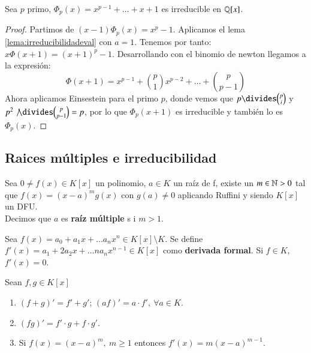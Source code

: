\begin{thm}
    Sea $p$ primo, $\Phi_p(x) = x^{p-1} + \ldots + x + 1$ es irreducible en $\mathbb{Q}[x]$.
\end{thm}
\begin{proof}
    Partimos de $(x-1)\Phi_p(x) = x^p - 1$. Aplicamos el lema \ref{lema:irreducibilidadeval} con $a = 1$. Tenemos por tanto:
    $x \Phi(x+1) = (x+1)^p - 1$. Desarrollando con el binomio de newton llegamos a la expresión:
    $$
        \Phi(x+1) = x^{p-1} + \binom{p}{1} x^{p-2} + \ldots + \binom{p}{p-1}
    $$
    Ahora aplicamos Einsestein para el primo $p$, donde vemos que $p \divides \binom{p}{i}$ y $p^2 \not \divides \binom{p}{p-1} = p$, por lo que $\Phi_p(x+1)$ es irreducible y también lo es $\Phi_p(x)$.
\end{proof}

\subsection{Raices múltiples e irreducibilidad}

\begin{dfn}
    Sea $0 \neq f(x) \in K[x]$ un polinomio, $a \in K$ un raíz de f, existe un $m \in \mathbb{N} > 0$ tal que $f(x) = (x - a)^m g(x)$ con $g(a) \neq 0$ aplicando Ruffini y siendo $K[x]$ un DFU.\\
    Decimos que $a$ es \textbf{raíz múltiple} s i $m > 1$.
\end{dfn}

\begin{dfn}
    Sea $f(x) = a_0 + a_1 x + \ldots a_n x^n \in K[x]\setminus K$. Se define $f'(x) = a_1 + 2a_2 x + \ldots n a_n x^{n-1} \in K[x]$ como \textbf{derivada formal}. Si $f \in K$, $f'(x) = 0$.
\end{dfn}

\begin{pro}
    Sean $f, g \in K[x]$
    \begin{enumerate}
        \item $(f + g)' = f' + g'$; $(af)' = a\cdot f',\ \forall a \in K$.
        \item $(fg)' = f' \cdot g + f \cdot g'$.
        \item Si $f(x) = (x - a)^m,\ m\geq 1$ entonces $f'(x) = m(x - a)^{m-1}$.
    \end{enumerate}
\end{pro}

